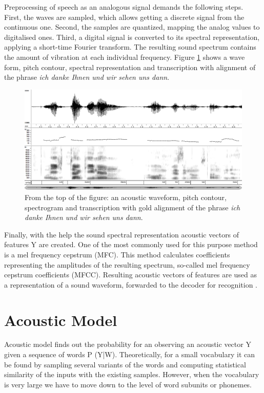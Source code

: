 Preprocessing of speech as an analogous signal demands the following steps. First, the waves are sampled, which allows getting a discrete signal from the 
continuous one. Second, the samples are quantized, mapping the analog values to digitalised ones. Third, a digital signal is converted to its 
spectral representation, applying a short-time Fourier transform. The resulting sound spectrum contains the amount of vibration at each individual frequency. 
Figure \ref {fig:spectro} shows a wave form, pitch contour, spectral
representation and transcription with alignment of the phrase \textit {ich danke
 Ihnen und wir sehen uns dann}.
\begin{figure}[htbp]
  \centering
    \includegraphics[width=1.0\textwidth]{images/spectro.png}
 \caption{From the top of the figure: an acoustic waveform, pitch contour,
 spectrogram and transcription with gold alignment of the phrase \textit {ich
 danke Ihnen und wir sehen uns dann}. }
  \label{fig:spectro}
\end {figure}

Finally, with the help the sound spectral representation acoustic vectors of
features Y are created. One of the most commonly used for this purpose method is a mel frequency
cepstrum (MFC). This method calculates coefficients representing the amplitudes
of the resulting spectrum, so-called mel frequency cepstrum coefficients (MFCC).
Resulting acoustic vectors of features are used as a representation of a sound waveform, forwarded to the decoder for recognition  \parencite
{jurafskymartin2009}.

\section {Acoustic Model} 

Acoustic model finds out the probability for an observing an acoustic vector Y
given a sequence of words P (Y|W). Theoretically, for a small vocabulary it can
be found by sampling several variants of the words and computing statistical similarity of the inputs with 
the existing samples. However, when the vocabulary is very large we have to move
down to the level of word subunits or phonemes.

